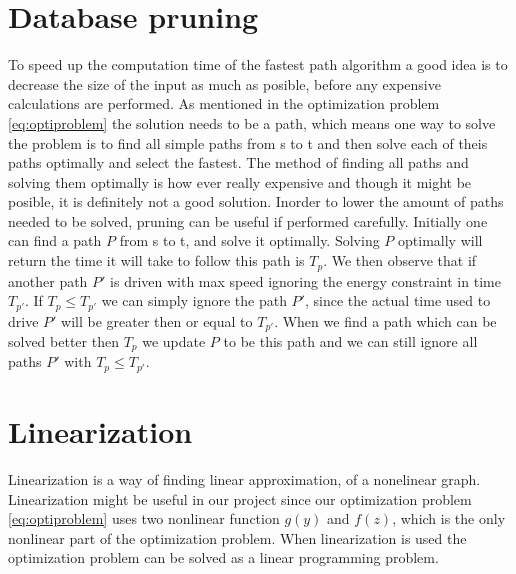 \section{Database pruning}
To speed up the computation time of the fastest path algorithm a good idea is to decrease the size of the input as much as posible, before any expensive calculations are performed. As mentioned in the optimization problem \ref{eq:optiproblem} the solution needs to be a path, which means one way to solve the problem is to find all simple paths from s to t and then solve each of theis paths optimally and select the fastest. The method of finding all paths and solving them optimally is how ever really expensive and though it might be posible, it is definitely not a good solution. Inorder to lower the amount of paths needed to be solved, pruning can be useful if performed carefully.  
Initially one can find a path $P$ from s to t, and solve it optimally. Solving 
$P$ optimally will return the time it will take to follow this path is $T_p$. We then 
observe that if another path $P'$ is driven with max speed ignoring the energy constraint in time $T_{p'}$. If $T_p \leq T_{p'}$ we can simply ignore the path $P'$, since the actual time used to drive $P'$ will be greater then or equal to $T_{p'}$.
When we find a path which can be solved better then $T_p$ we update $P$ to be this path and we can still ignore all paths $P'$ with $T_p \leq T_{p'}$. 

\section{Linearization}
Linearization is a way of finding linear approximation, of a nonelinear graph. Linearization might be useful in our project since our optimization problem \ref{eq:optiproblem} uses two nonlinear function $g(y)$ and $f(z)$, which is the only nonlinear part of the optimization problem. When linearization is used the optimization problem can be solved as a linear programming problem. 